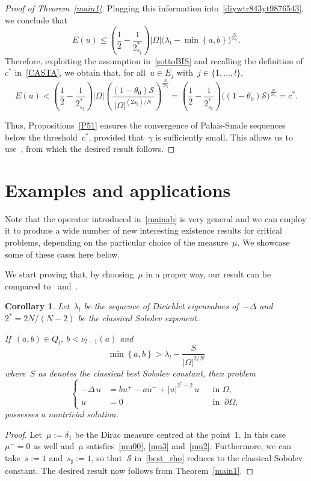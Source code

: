 \documentclass[12pt,a4paper,intlimits,sumlimits]{amsart}
\newcommand{\set}[1]{\left\{#1\right\}}
\theoremstyle{definition}
\theoremstyle{plain}
\newtheorem{corollary}[definition]{Corollary}
\numberwithin{equation}{section}
\renewcommand{\le}{\leqslant}
\begin{document}
\begin{proof}[Proof of Theorem~\ref{main1}]
Plugging this information into~\eqref{diywtr843yt9876543}, we conclude that
$$ E(u)\le\left(\frac12-\frac1{2_{s_\sharp}^*}\right) |\Omega| \big(\lambda_l
- \min \set{a,b}\big)^{\frac{N}{2s_\sharp}}.
$$
Therefore, exploiting the assumption in~\eqref{sottoBIS} and recalling the definition of~$c^\ast$ in~\eqref{CASTA}, we obtain that,
for all~$u\in E_j$ with~$j\in\{1,\dots,l\}$,
$$ E(u)< \left(\frac12-\frac1{2_{s_\sharp}^*}\right) |\Omega| \left(\frac{(1-\theta_0)\mathcal S}{|\Omega|^{(2 s_\sharp)/N}}\right)^{\frac{N}{2s_\sharp}}
=\left(\frac12-\frac1{2_{s_\sharp}^*}\right) \big( (1-\theta_0){\mathcal S}\big)^{\frac{N}{2s_\sharp}}=c^\ast.
$$

Thus, Propositions~\ref{P51} ensures the convergence of Palais-Smale sequences below the threshold~$c^\ast$, 
provided that~$\gamma$ is sufficiently small.
This allows us to use~\cite[Theorem 4.1]{MR4535437},
from which the desired result follows. 
\end{proof}

\section{Examples and applications}\label{EXA:A}

Note that the operator introduced in~\eqref{mainab} is very general and we can employ it to produce a wide number of new interesting existence results for critical problems, depending on the particular choice of the measure~$\mu$. We showcase some of these cases here below.\medskip

We start proving that, by choosing~$\mu$ in a proper way, 
our result can be compared to~\cite[Theorem 1.3]{MR4535437} and~\cite[Theorem 1.2]{MPSS}.
\begin{corollary}\label{ILS}
Let~$\lambda_l$ be the sequence of Dirichlet eigenvalues of~$-\Delta$
and~$2^* = 2N/(N-2)$ be the classical Sobolev exponent. 

If~$(a, b)\in Q_l$, $b <\nu_{l-1}(a)$ and
\begin{equation*}
\min \set{a,b} > \lambda_l -\frac{S}{|\Omega|^{2/N}}
\end{equation*}
where~$S$ as denotes the classical best Sobolev constant, then
problem
\begin{equation*}
\left\{\begin{aligned}
-\Delta \, u & = bu^+ - au^- + |u|^{2^* - 2}\, u && \text{in } \Omega,\\
u & = 0 && \text{in } \ \partial\Omega,
\end{aligned}\right.
\end{equation*}
possesses a nontrivial solution.
\end{corollary}
\begin{proof}
Let~$\mu:= \delta_1$ be the Dirac measure centred at the point~$1$. 
In this case~$\mu^-=0$ as well and~$\mu$ satisfies~\eqref{mu00}, \eqref{mu3}
and~\eqref{mu2}. 
Furthermore, we can take~$\overline s:=1$ and~$s_\sharp:=1$, so that~${\mathcal{S}}$ in~\eqref{best_rho} reduces to the classical Sobolev constant. The desired result now follows from
Theorem~\ref{main1}.
\end{proof}
\end{document}

